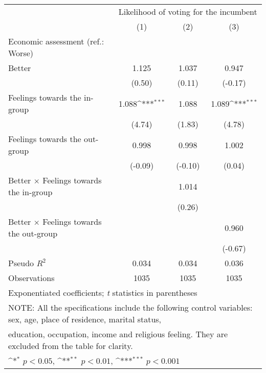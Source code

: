{
\def\sym#1{\ifmmode^{#1}\else\(^{#1}\)\fi}
\begin{tabular}{l*{3}{c}}
\toprule
                &\multicolumn{3}{c}{Likelihood of voting for the incumbent}\\\cmidrule(lr){2-4}
                &\multicolumn{1}{c}{(1)}         &\multicolumn{1}{c}{(2)}         &\multicolumn{1}{c}{(3)}         \\
\midrule
Economic assessment (ref.: Worse)&                  &                  &                  \\
Better          &    1.125         &    1.037         &    0.947         \\
                &   (0.50)         &   (0.11)         &  (-0.17)         \\
Feelings towards the in-group&    1.088\sym{***}&    1.088         &    1.089\sym{***}\\
                &   (4.74)         &   (1.83)         &   (4.78)         \\
Feelings towards the out-group&    0.998         &    0.998         &    1.002         \\
                &  (-0.09)         &  (-0.10)         &   (0.04)         \\
Better $\times$ Feelings towards the in-group&                  &    1.014         &                  \\
                &                  &   (0.26)         &                  \\
Better $\times$ Feelings towards the out-group&                  &                  &    0.960         \\
                &                  &                  &  (-0.67)         \\
\midrule
Pseudo \(R^{2}\)&    0.034         &    0.034         &    0.036         \\
Observations    &     1035         &     1035         &     1035         \\
\bottomrule
\multicolumn{4}{l}{\footnotesize Exponentiated coefficients; \textit{t} statistics in parentheses}\\
\multicolumn{4}{l}{\footnotesize NOTE: All the specifications include the following control variables: sex, age, place of residence, marital status,}\\
\multicolumn{4}{l}{\footnotesize education, occupation, income and religious feeling. They are excluded from the table for clarity.}\\
\multicolumn{4}{l}{\footnotesize \sym{*} \(p<0.05\), \sym{**} \(p<0.01\), \sym{***} \(p<0.001\)}\\
\end{tabular}
}

